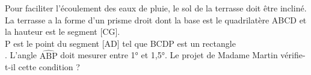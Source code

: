 \begin{exercice*}
  Pour faciliter l'écoulement des eaux de pluie, le sol de la terrasse doit être incliné.\\\smallskip
  La terrasse a la forme d'un prisme droit dont la base est le quadrilatère ABCD et la hauteur est le segment [CG].\\\smallskip    
  P est le point du segment [AD] tel que BCDP est un rectangle\\.
  L'angle $ \widehat{\text{ABP}} $ doit mesurer entre 1° et 1,5°.
  Le projet de Madame Martin vérifie-t-il cette condition ?
\end{exercice*}
